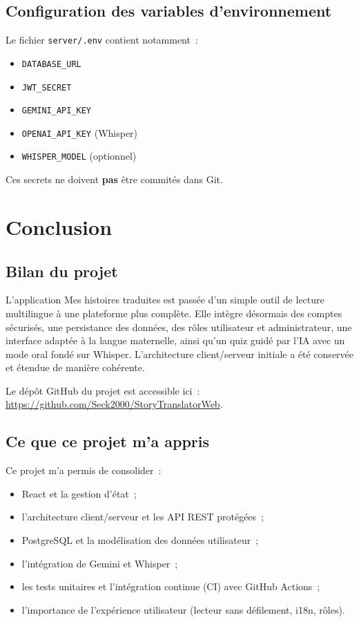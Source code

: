 \documentclass[12pt,twoside,letterpaper]{article}
\newcommand{\appname}{Mes histoires traduites}
\begin{document}
\subsection{Configuration des variables d'environnement}
Le fichier \texttt{server/.env} contient notamment~:
\begin{itemize}
    \item \texttt{DATABASE\_URL}
    \item \texttt{JWT\_SECRET}
    \item \texttt{GEMINI\_API\_KEY}
    \item \texttt{OPENAI\_API\_KEY} (Whisper)
    \item \texttt{WHISPER\_MODEL} (optionnel)
\end{itemize}
Ces secrets ne doivent \textbf{pas} être commités dans Git.

\newpage

\section{Conclusion}
\label{sec:conclusion}

\subsection{Bilan du projet}
L'application \appname{} est passée d'un simple outil de lecture multilingue à une plateforme plus complète.
Elle intègre désormais des comptes sécurisés, une persistance des données, des rôles utilisateur et administrateur, une interface adaptée à la langue maternelle, ainsi qu'un quiz guidé par l'IA avec un mode oral fondé sur Whisper.
L'architecture client/serveur initiale a été conservée et étendue de manière cohérente.

Le dépôt GitHub du projet est accessible ici~: \url{https://github.com/Seck2000/StoryTranslatorWeb}.

\subsection{Ce que ce projet m'a appris}
Ce projet m'a permis de consolider~:
\begin{itemize}
    \item React et la gestion d'état~;
    \item l'architecture client/serveur et les API REST protégées~;
    \item PostgreSQL et la modélisation des données utilisateur~;
    \item l'intégration de Gemini et Whisper~;
    \item les tests unitaires et l'intégration continue (CI) avec GitHub Actions~;
    \item l'importance de l'expérience utilisateur (lecteur sans défilement, i18n, rôles).
\end{itemize}
\end{document}
